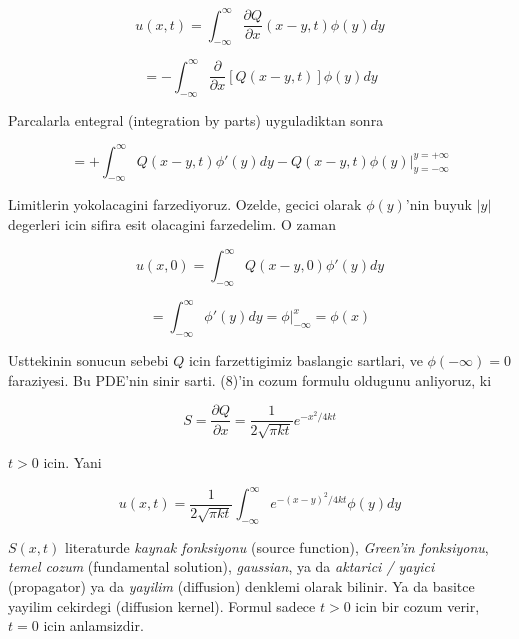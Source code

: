 \documentclass[12pt,fleqn]{article}\usepackage{../common}
\begin{document}
\[ u(x,t) = \int _{-\infty}^{\infty} 
\frac{\partial Q}{\partial x}(x-y,t)\phi(y)dy
\]

\[ = -\int _{-\infty}^{\infty} 
\frac{\partial }{\partial x}[Q(x-y,t)]\phi(y)dy
  \]

Parcalarla entegral (integration by parts) uyguladiktan sonra 

\[ 
=  + \int _{-\infty}^{\infty} 
Q(x-y,t)\phi'(y)dy - 
Q(x-y,t)\phi(y) \bigg| _{y=-\infty}^{y=+\infty}
  \]

Limitlerin yokolacagini farzediyoruz. Ozelde, gecici olarak $\phi(y)$'nin
buyuk $|y|$ degerleri icin sifira esit olacagini farzedelim. O zaman 

\[ u(x,0) = 
\int _{-\infty}^{\infty} Q(x-y, 0) \phi'(y)dy 
 \]

\[ 
= \int _{-\infty}^{\infty} \phi'(y)dy = \phi \bigg| _{-\infty}^{x} = \phi(x)
 \]

Usttekinin sonucun sebebi $Q$ icin farzettigimiz baslangic sartlari, ve
$\phi(-\infty) = 0$ faraziyesi. Bu PDE'nin sinir sarti. (8)'in cozum
formulu oldugunu anliyoruz, ki 

\[ S = \frac{\partial Q}{\partial x} = \frac{ 1}{2\sqrt{\pi kt}} 
e^{ -x^2 / 4kt}
\]

$t>0$ icin. Yani 

\[ u(x,t) = 
 \frac{ 1}{2\sqrt{\pi kt}} 
\int _{-\infty}^{\infty} e^{-(x-y)^2 / 4kt} \phi(y) dy
 \]

$S(x,t)$ literaturde {\em kaynak fonksiyonu} (source function), {\em Green'in
fonksiyonu}, {\em temel cozum} (fundamental solution), {\em gaussian}, ya
da {\em aktarici / yayici} (propagator) ya da {\em yayilim} (diffusion) denklemi
olarak bilinir. Ya da basitce yayilim cekirdegi (diffusion kernel). Formul
sadece $t>0$ icin bir cozum verir, $t=0$ icin anlamsizdir. 
\end{document}
